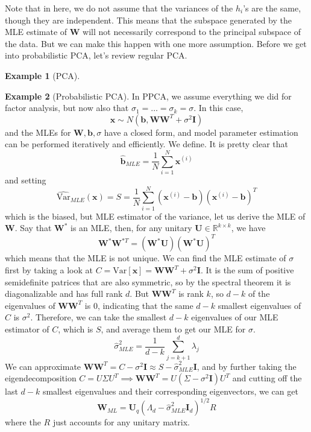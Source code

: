 \documentclass{article}
\theoremstyle{definition}
\newtheorem{example}{Example}[section]
\theoremstyle{remark}
\theoremstyle{definition}
\begin{document}
Note that in here, we do not assume that the variances of the $h_i$'s are the same, though they are independent. This means that the subspace generated by the MLE estimate of $\mathbf{W}$ will not necessarily correspond to the principal subspace of the data. But we can make this happen with one more assumption. Before we get into probabilistic PCA, let's review regular PCA. 

\begin{example}[PCA] 
    
\end{example} 

\begin{example}[Probabilistic PCA] 
In PPCA, we assume everything we did for factor analysis, but now also that $\sigma_1 = \ldots = \sigma_k = \sigma$. In this case, 
\[\mathbf{x} \sim N(\mathbf{b}, \mathbf{W}\mathbf{W}^T + \sigma^2 \mathbf{I})\]
and the MLEs for $\mathbf{W}, \mathbf{b}, \sigma$ have a closed form, and model parameter estimation can be performed iteratively and efficiently. We define. It is pretty clear that 
\[\hat{\mathbf{b}}_{MLE} = \frac{1}{N} \sum_{i=1}^N \mathbf{x}^{(i)}\]
and setting 
\[\widehat{\mathrm{Var}}_{MLE}(\mathbf{x}) = S = \frac{1}{N} \sum_{i=1}^N (\mathbf{x}^{(i)} - \mathbf{b}) (\mathbf{x}^{(i)} - \mathbf{b})^T\]
which is the biased, but MLE estimator of the variance, let us derive the MLE of $\mathbf{W}$. Say that $\mathbf{W}^\ast$ is an MLE, then, for any unitary $\mathbf{U} \in \mathbb{R}^{k \times k}$, we have 
\[\mathbf{W}^\ast \mathbf{W}^{\ast T} = (\mathbf{W}^\ast \mathbf{U}) (\mathbf{W}^\ast \mathbf{U})^T \]
which means that the MLE is not unique. We can find the MLE estimate of $\sigma$ first by taking a look at $C = \mathrm{Var}[\mathbf{x}] = \mathbf{W} \mathbf{W}^T + \sigma^2 \mathbf{I}$. It is the sum of positive semidefinite patrices that are also symmetric, so by the spectral theorem it is diagonalizable and has full rank $d$. But $\mathbf{W} \mathbf{W}^T$ is rank $k$, so $d - k$ of the eigenvalues of $\mathbf{W} \mathbf{W}^T$ is $0$, indicating that the same $d-k$ smallest eigenvalues of $C$ is $\sigma^2$. Therefore, we can take the smallest $d-k$ eigenvalues of our MLE estimator of $C$, which is $S$, and average them to get our MLE for $\sigma$. 
\[\hat{\sigma}^2_{MLE} = \frac{1}{d-k} \sum_{j=k+1}^d \lambda_j\]
We can approximate $\mathbf{W} \mathbf{W}^T = C - \sigma^2 \mathbf{I} \approx S - \hat{\sigma}^2_{MLE} \mathbf{I}$, and by further taking the eigendecomposition $C = U \Sigma U^T \implies \mathbf{W} \mathbf{W}^T = U (\Sigma - \sigma^2 \mathbf{I}) U^T$ and cutting off the last $d-k$ smallest eigenvalues and their corresponding eigenvectors, we can get 
\[\mathbf{W}_{ML} = \mathbf{U}_q (\Lambda_d - \hat{\sigma}_{MLE}^2 \mathbf{I}_d )^{1/2} R\] 
where the $R$ just accounts for any unitary matrix. 
\end{example}
\end{document}

